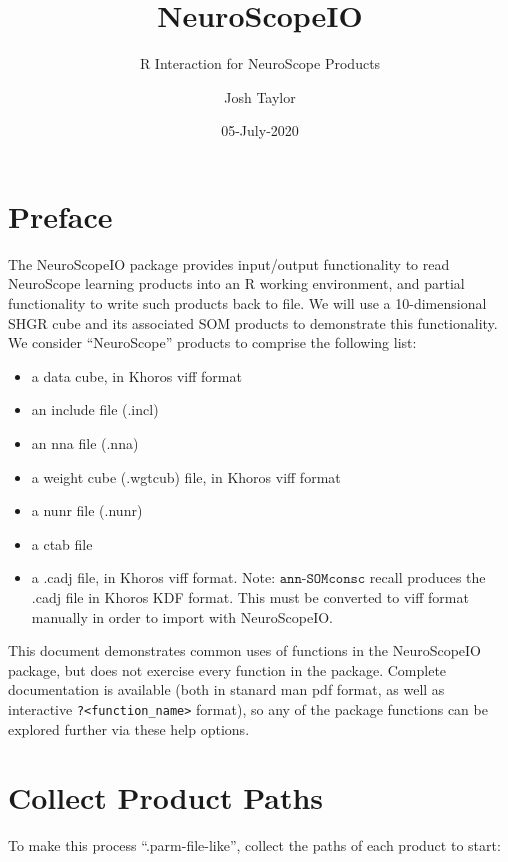 \documentclass[]{article}
\title{NeuroScopeIO}
\subtitle{R Interaction for NeuroScope Products}
\author{Josh Taylor}
\date{05-July-2020}
\providecommand{\tightlist}{%
  \setlength{\itemsep}{0pt}\setlength{\parskip}{0pt}}
\begin{document}
\maketitle

{
\setcounter{tocdepth}{2}
\tableofcontents
}
\hypertarget{preface}{%
\section*{Preface}\label{preface}}

The NeuroScopeIO package provides input/output functionality to read NeuroScope learning products into an R working environment, and partial functionality to write such products back to file. We will use a 10-dimensional SHGR cube and its associated SOM products to demonstrate this functionality. We consider ``NeuroScope'' products to comprise the following list:

\begin{itemize}
\tightlist
\item
  a data cube, in Khoros viff format
\item
  an include file (.incl)
\item
  an nna file (.nna)
\item
  a weight cube (.wgtcub) file, in Khoros viff format
\item
  a nunr file (.nunr)
\item
  a ctab file
\item
  a .cadj file, in Khoros viff format. Note: \(\texttt{ann-SOMconsc}\) recall produces the .cadj file in Khoros KDF format. This must be converted to viff format manually in order to import with NeuroScopeIO.
\end{itemize}

This document demonstrates common uses of functions in the NeuroScopeIO package, but does not exercise every function in the package. Complete documentation is available (both in stanard man pdf format, as well as interactive \texttt{?\textless{}function\_name\textgreater{}} format), so any of the package functions can be explored further via these help options.

\hypertarget{collect-product-paths}{%
\section{Collect Product Paths}\label{collect-product-paths}}

To make this process ``.parm-file-like'', collect the paths of each product to start:
\end{document}
